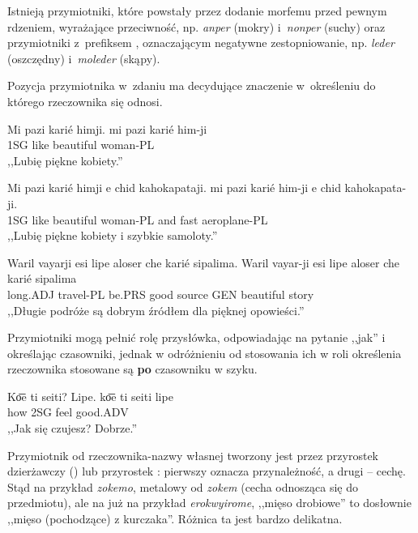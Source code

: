 \begin{spacing}{1.1}
Istnieją przymiotniki, które powstały przez dodanie morfemu  przed
pewnym rdzeniem, wyrażające przeciwność, np. \emph{anper}  (mokry)
i~\emph{nonper}  (suchy) oraz przymiotniki z~prefiksem ,
oznaczającym negatywne zestopniowanie, np. \emph{leder}  (oszczędny)
i~\emph{moleder}  (skąpy).

Pozycja przymiotnika w~zdaniu ma decydujące znaczenie w~określeniu do którego
rzeczownika się odnosi.

\begin{exe}
	\ex
	\trans Mi pazi karié himji.
	\gll mi pazi karié him-ji\\
	  1SG like beautiful woman-PL\\
	\glt  ,,Lubię piękne kobiety.''
\end{exe}

\begin{exe}
	\ex
	\trans Mi pazi karié himji e chid kahokapataji.
	\gll mi pazi karié him-ji e chid kahokapata-ji.\\
	  1SG like beautiful woman-PL and fast aeroplane-PL\\
	\glt  ,,Lubię piękne kobiety i szybkie samoloty.''
\end{exe}

\begin{exe}
	\ex
	\trans Waril vayarji esi lipe aloser che karié sipalima.
	\gll Waril vayar-ji esi lipe aloser che karié sipalima\\
	  long.ADJ travel-PL be.PRS good source GEN beautiful story\\
	\glt  ,,Długie podróże są dobrym źródłem dla pięknej opowieści.''
\end{exe}

Przymiotniki mogą pełnić rolę przysłówka, odpowiadając na pytanie ,,jak'' i
określając czasowniki, jednak w odróżnieniu od stosowania ich w roli określenia
rzeczownika stosowane są \textbf{po} czasowniku w szyku.

\begin{exe}
	\ex
	\trans Ko͞e ti seiti? Lipe.
	\gll ko͞e ti seiti lipe\\
	  how 2SG feel good.ADV\\
	\glt  ,,Jak się czujesz? Dobrze.''
\end{exe}

Przymiotnik od rzeczownika-nazwy własnej tworzony jest przez przyrostek
dzierżawczy  () lub przyrostek : pierwszy oznacza
przynależność, a drugi -- cechę. Stąd na przykład \emph{zokemo}, metalowy od
\emph{zokem} (cecha odnosząca się do przedmiotu), ale na już na przykład
\emph{erokwyirome}, ,,mięso drobiowe'' to dosłownie ,,mięso (pochodzące) z
kurczaka''. Różnica ta jest bardzo delikatna.


\end{spacing}

